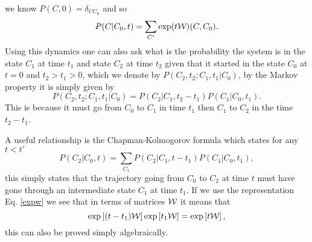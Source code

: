 \documentclass[11pt]{report}
\begin{document}
we know $P(C,0) = \delta_{CC_0}$ and so
\begin{equation}
P(C|C_0,t) = \sum_{C'} \exp(t {\cal W})(C,C_0).\label{expw}
\end{equation}
Using this dynamics one can also ask what is the probability the system is in the state $C_1$ at time $t_1$ and state $C_2$ at time $t_2$ given that it started in the state $C_0$ at $t=0$ and $t_2>t_1>0$, which we denote by $P(C_2,t_2;C_1,t_1|C_0)$, by the Markov property it is simply given by
\begin{equation}
P(C_2,t_2;C_1,t_1|C_0)= P(C_2|C_1,t_2-t_1)P(C_1|C_0,t_1).
\end{equation}
This is because it must go from $C_0$ to $C_1$ in time $t_1$ then $C_1$ to $C_2$ in the time $t_2-t_1$.

A useful relationship is the Chapman-Kolmogorov formula which states for any $t<t'$
\begin{equation}
\boxed{
P(C_2|C_0,t) = \sum_{C_1} P(C_2|C_1,t-t_1)P(C_1|C_0,t_1),}
\end{equation}
this simply states that the trajectory going from $C_0$ to $C_2$ at time $t$ must have gone
through an intermediate state $C_1$ at time $t_1$. If we use the representation  Eq. \eqref{expw} we see that in terms of matrices ${\cal W}$ it means that
\begin{equation}
\exp\left[(t-t_1){\cal W}\right] \exp\left[t_1{\cal W}\right] = \exp\left[t{\cal W}\right],
\end{equation}
this can also be proved simply algebraically. 
\end{document}
